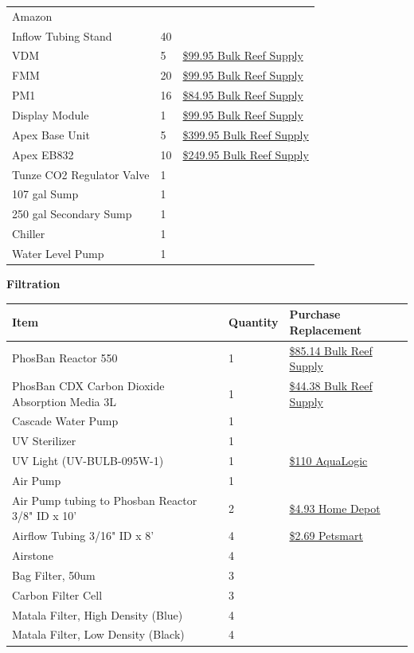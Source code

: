 \documentclass[]{book}
\begin{document}
\begin{longtable}[]{@{}lll@{}}
{Amazon}\tabularnewline
Inflow Tubing Stand & 40 &\tabularnewline
VDM & 5 &
\href{https://www.bulkreefsupply.com/led-pumps-control-module-vdm-neptune-systems.html}{\$99.95
Bulk Reef Supply}\tabularnewline
FMM & 20 &
\href{https://www.bulkreefsupply.com/fmm-fluid-monitoring-module-neptune-systems.html}{\$99.95
Bulk Reef Supply}\tabularnewline
PM1 & 16 &
\href{https://www.bulkreefsupply.com/ph-orp-probe-module-pm1-neptune-systems.html}{\$84.95
Bulk Reef Supply}\tabularnewline
Display Module & 1 &
\href{https://www.bulkreefsupply.com/apex-display-module-neptune-systems.html}{\$99.95
Bulk Reef Supply}\tabularnewline
Apex Base Unit & 5 &
\href{https://www.bulkreefsupply.com/apex-controller-base-unit-neptune-systems.html}{\$399.95
Bulk Reef Supply}\tabularnewline
Apex EB832 & 10 &
\href{https://www.bulkreefsupply.com/energybar-832-neptune-systems.html}{\$249.95
Bulk Reef Supply}\tabularnewline
Tunze CO2 Regulator Valve & 1 &\tabularnewline
107 gal Sump & 1 &\tabularnewline
250 gal Secondary Sump & 1 &\tabularnewline
Chiller & 1 &\tabularnewline
Water Level Pump & 1 &\tabularnewline
\bottomrule
\end{longtable}

 \textbf{Filtration}

\begin{longtable}[]{@{}lll@{}}
\toprule
Item & Quantity & Purchase Replacement\tabularnewline
\midrule
\endhead
PhosBan Reactor 550 & 1 &
\href{https://www.bulkreefsupply.com/phosban-reactor-550.html}{\$85.14
Bulk Reef Supply}\tabularnewline
PhosBan CDX Carbon Dioxide Absorption Media 3L & 1 &
\href{https://www.bulkreefsupply.com/cdx-carbon-dioxide-adsorption-media-two-little-fishies.html}{\$44.38
Bulk Reef Supply}\tabularnewline
Cascade Water Pump & 1 &\tabularnewline
UV Sterilizer & 1 &\tabularnewline
UV Light (UV-BULB-095W-1) & 1 &
\href{https://aqualogicinc.com/product/aqua-logic-uv-lamps/}{\$110
AquaLogic}\tabularnewline
Air Pump & 1 &\tabularnewline
Air Pump tubing to Phosban Reactor 3/8" ID x 10' & 2 &
\href{https://www.homedepot.com/p/UDP-3-8-in-I-D-x-1-2-in-O-D-x-10-ft-Clear-Vinyl-Tubing-T10006008/304185141}{\$4.93
Home Depot}\tabularnewline
Airflow Tubing 3/16" ID x 8' & 4 &
\href{https://www.petsmart.com/fish/filters-and-pumps/air-and-water-pumps/grreat-choice-airline-tubing-5202767.html}{\$2.69
Petsmart}\tabularnewline
Airstone & 4 &\tabularnewline
Bag Filter, 50um & 3 &\tabularnewline
Carbon Filter Cell & 3 &\tabularnewline
Matala Filter, High Density (Blue) & 4 &\tabularnewline
Matala Filter, Low Density (Black) & 4 &\tabularnewline
\bottomrule
\end{longtable}
\end{document}

